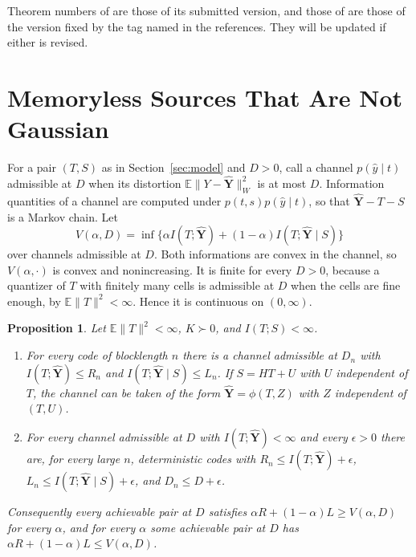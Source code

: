 \documentclass[11pt,onecolumn]{IEEEtran}
\newtheorem{proposition}[theorem]{Proposition}
\newcommand{\E}{\mathbb{E}}
\newcommand{\hY}{\hat{\mathbf Y}}
\begin{document}
Theorem numbers of \cite{part1} are those of its submitted version,
and those of \cite{part2} are those of the version fixed by the tag
named in the references. They will be updated if either is revised.

\section{Memoryless Sources That Are Not Gaussian}
\label{sec:nongauss}

For a pair $(T,S)$ as in Section~\ref{sec:model} and $D>0$, call a
channel $p(\hat y\mid t)$ admissible at $D$ when its distortion
$\E\|Y-\hY\|_W^2$ is at most $D$. Information quantities of a channel
are computed under $p(t,s)p(\hat y\mid t)$, so that $\hY-T-S$ is a
Markov chain. Let
\[
V(\alpha,D)=\inf\bigl\{\alpha I(T;\hY)+(1-\alpha)I(T;\hY\mid S)\bigr\}
\]
over channels admissible at $D$. Both informations are convex in the
channel, so $V(\alpha,\cdot)$ is convex and nonincreasing. It is
finite for every $D>0$, because a quantizer of $T$ with finitely many
cells is admissible at $D$ when the cells are fine enough, by
$\E\|T\|^2<\infty$. Hence it is continuous on $(0,\infty)$.

\begin{proposition}\label{prop:coding}
Let $\E\|T\|^2<\infty$, $K\succ0$, and $I(T;S)<\infty$.
\begin{enumerate}
\item[(a)] For every code of blocklength $n$ there is a channel
admissible at $D_n$ with $I(T;\hY)\le R_n$ and
$I(T;\hY\mid S)\le L_n$. If $S=HT+U$ with $U$ independent of $T$, the
channel can be taken of the form $\hY=\phi(T,Z)$ with $Z$ independent
of $(T,U)$.
\item[(b)] For every channel admissible at $D$ with $I(T;\hY)<\infty$
and every $\epsilon>0$ there are, for every large $n$, deterministic
codes with $R_n\le I(T;\hY)+\epsilon$,
$L_n\le I(T;\hY\mid S)+\epsilon$, and $D_n\le D+\epsilon$.
\end{enumerate}
Consequently every achievable pair at $D$ satisfies
$\alpha R+(1-\alpha)L\ge V(\alpha,D)$ for every $\alpha$, and for every
$\alpha$ some achievable pair at $D$ has
$\alpha R+(1-\alpha)L\le V(\alpha,D)$.
\end{proposition}
\end{document}
